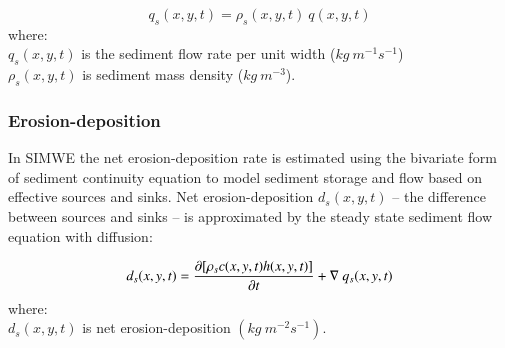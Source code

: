 \documentclass[final,3p,times,twocolumn]{elsarticle}
\begin{document}
\begin{equation}\label{eq:sedflow} 
q_s(x,y,t) = \rho_s(x,y,t) ~ q(x,y,t)
\end{equation}
%
{\small
\noindent
where: \\
\hspace*{0.5em} $q_s(x,y,t)$ is the sediment flow rate per unit width ($kg~m^{-1}s^{-1}$)\\
\hspace*{0.5em} $\rho_s(x,y,t)$ is sediment mass density ($kg~m^{-3}$).\\
}

\subsubsection{Erosion-deposition}
In SIMWE 
the net erosion-deposition rate is estimated
using the bivariate form of sediment continuity equation
to model sediment storage and flow 
based on effective sources and sinks.
Net erosion-deposition $d_s(x,y,t)$
-- the difference between sources and sinks --
is approximated by
the steady state sediment flow equation with diffusion:

\begin{equation}\label{eq:sediment} 
d_s(x,y,t) = 
{\partial [\rho_sc(x,y,t)h(x,y,t)] \over \partial t} +
\nabla ~ q_s(x,y,t)
\end{equation}
%
{\small
\noindent
where: \\
\hspace*{0.5em} $d_s(x,y,t)$ is net erosion-deposition $(kg ~ m^{-2} s^{-1})$.\\
}

\end{document}
